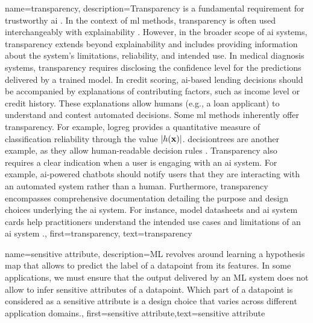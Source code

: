 {name={transparency},
	description={Transparency is a fundamental requirement for 
		trustworthy \gls{ai} \cite{HLEGTrustworhtyAI}. In the context of \gls{ml} 
		methods, transparency is often used interchangeably with \gls{explainability} 
		\cite{gallese2023ai,JunXML2020}. However, in the broader scope of \gls{ai} 
		systems, transparency extends beyond explainability and includes providing information 
		about the system’s limitations, reliability, and intended use. 
		In medical diagnosis systems, transparency requires disclosing the confidence level 
		for the \gls{prediction}s delivered by a trained \gls{model}. In credit scoring, 
		\gls{ai}-based lending decisions should be accompanied by explanations of 
		contributing factors, such as income level or credit history. These explanations 
		allow humans (e.g., a loan applicant) to understand and contest automated decisions. 
		Some \gls{ml} methods inherently offer transparency. For example, \gls{logreg} 
		provides a quantitative measure of classification reliability through the value $|h({\bf x})|$. 
		\Gls{decisiontree}s are another example, as they allow human-readable decision rules \cite{rudin2019stop}.
		Transparency also requires a clear indication when a user is engaging with an \gls{ai} system. 
		For example, \gls{ai}-powered chatbots should notify users that they are interacting with an 
		automated system rather than a human. Furthermore, transparency encompasses comprehensive 
		documentation detailing the purpose and design choices underlying the \gls{ai} system. 
		For instance, \gls{model} datasheets \cite{DatasheetData2021} and \gls{ai} system cards \cite{10.1145/3287560.3287596} 
		help practitioners understand the intended use cases and limitations of an \gls{ai} system \cite{Shahriari2017}.},
	first={transparency}, text={transparency} 
}



{name={sensitive attribute},
	description={ML revolves around learning a \gls{hypothesis} map that allows 
		to predict the \gls{label} of a \gls{datapoint} from its \gls{feature}s. In some 
		applications, we must ensure that the output delivered by an ML system does 
		not allow to infer sensitive attributes of a \gls{datapoint}. Which part 
		of a \gls{datapoint} is considered as a sensitive attribute is a design 
		choice that varies across different application domains.},
	first={sensitive attribute},text={sensitive attribute} 
}


